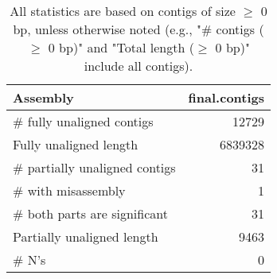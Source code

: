 \documentclass[12pt,a4paper]{article}
\begin{document}
\begin{table}[ht]
\begin{center}
\caption{All statistics are based on contigs of size $\geq$ 0 bp, unless otherwise noted (e.g., "\# contigs ($\geq$ 0 bp)" and "Total length ($\geq$ 0 bp)" include all contigs).}
\begin{tabular}{|l*{1}{|r}|}
\hline
Assembly & final.contigs \\ \hline
\# fully unaligned contigs & 12729 \\ \hline
Fully unaligned length & 6839328 \\ \hline
\# partially unaligned contigs & 31 \\ \hline
\hspace{5mm}\# with misassembly & 1 \\ \hline
\hspace{5mm}\# both parts are significant & 31 \\ \hline
Partially unaligned length & 9463 \\ \hline
\# N's & 0 \\ \hline
\end{tabular}
\end{center}
\end{table}
\end{document}
